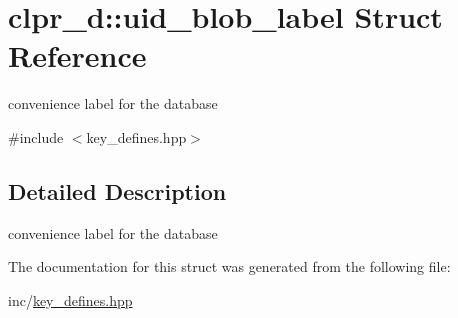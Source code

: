 \hypertarget{structclpr__d_1_1uid__blob__label}{\section{clpr\-\_\-d\-:\-:uid\-\_\-blob\-\_\-label \-Struct \-Reference}
\label{structclpr__d_1_1uid__blob__label}
}


convenience label for the database  




{\ttfamily \#include $<$key\-\_\-defines.\-hpp$>$}



\subsection{\-Detailed \-Description}
convenience label for the database 

\-The documentation for this struct was generated from the following file\-:\begin{DoxyCompactItemize}
\item 
inc/\hyperlink{key__defines_8hpp}{key\-\_\-defines.\-hpp}\end{DoxyCompactItemize}
